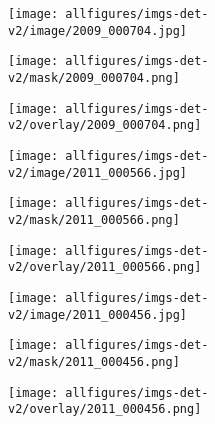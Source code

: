 \documentclass{article} \usepackage{iclr2022_conference,times}
\begin{document}
\begin{figure}[ht]
\centering
\begin{subfigure}{.33\textwidth}
  \centering
  \texttt{[image: allfigures/imgs-det-v2/image/2009\_000704.jpg]}
\end{subfigure}\hfil
\begin{subfigure}{.33\textwidth}
  \centering
  \texttt{[image: allfigures/imgs-det-v2/mask/2009\_000704.png]}
\end{subfigure}\hfil
\begin{subfigure}{.33\textwidth}
  \centering
  \texttt{[image: allfigures/imgs-det-v2/overlay/2009\_000704.png]}
\end{subfigure}\hfil

\vspace{0.5cm}

\begin{subfigure}{.33\textwidth}
  \centering
  \texttt{[image: allfigures/imgs-det-v2/image/2011\_000566.jpg]}
\end{subfigure}\hfil
\begin{subfigure}{.33\textwidth}
  \centering
  \texttt{[image: allfigures/imgs-det-v2/mask/2011\_000566.png]}
\end{subfigure}\hfil
\begin{subfigure}{.33\textwidth}
  \centering
  \texttt{[image: allfigures/imgs-det-v2/overlay/2011\_000566.png]}
\end{subfigure}\hfil

\vspace{0.5cm}

\begin{subfigure}{.33\textwidth}
  \centering
  \texttt{[image: allfigures/imgs-det-v2/image/2011\_000456.jpg]}
\end{subfigure}\hfil
\begin{subfigure}{.33\textwidth}
  \centering
  \texttt{[image: allfigures/imgs-det-v2/mask/2011\_000456.png]}
\end{subfigure}\hfil
\begin{subfigure}{.33\textwidth}
  \centering
  \texttt{[image: allfigures/imgs-det-v2/overlay/2011\_000456.png]}
\end{subfigure}\hfil

\vspace{0.5cm}


\end{figure}
\end{document}
